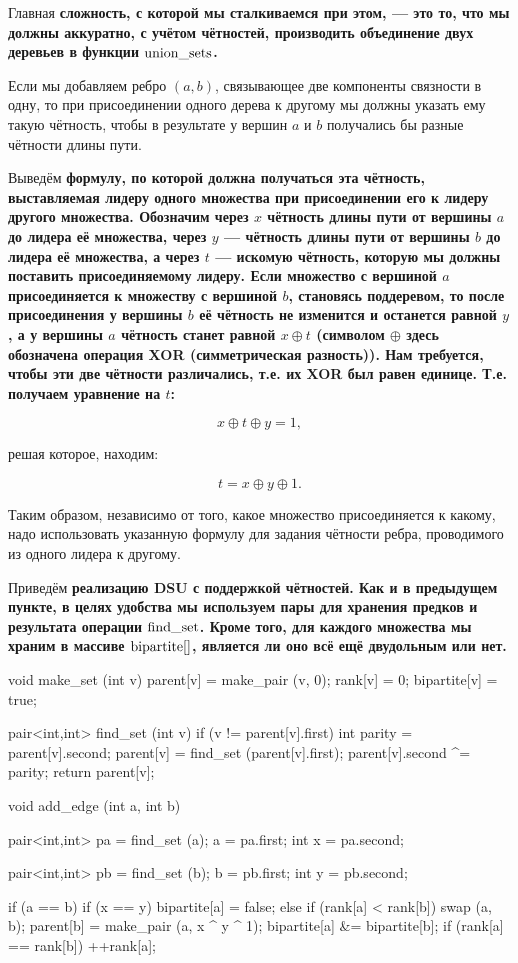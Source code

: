 Главная \bf{сложность}, с которой мы сталкиваемся при этом, --- это то, что мы должны аккуратно, с учётом чётностей, производить объединение двух деревьев в функции $\rm union\_sets$.

Если мы добавляем ребро $(a,b)$, связывающее две компоненты связности в одну, то при присоединении одного дерева к другому мы должны указать ему такую чётность, чтобы в результате у вершин $a$ и $b$ получались бы разные чётности длины пути.

Выведём \bf{формулу}, по которой должна получаться эта чётность, выставляемая лидеру одного множества при присоединении его к лидеру другого множества. Обозначим через $x$ чётность длины пути от вершины $a$ до лидера её множества, через $y$ --- чётность длины пути от вершины $b$ до лидера её множества, а через $t$ --- искомую чётность, которую мы должны поставить присоединяемому лидеру. Если множество с вершиной $a$ присоединяется к множеству с вершиной $b$, становясь поддеревом, то после присоединения у вершины $b$ её чётность не изменится и останется равной $y$, а у вершины $a$ чётность станет равной $x \oplus t$ (символом $\oplus$ здесь обозначена операция XOR (симметрическая разность)). Нам требуется, чтобы эти две чётности различались, т.е. их XOR был равен единице. Т.е. получаем уравнение на $t$:

$$ x \oplus t \oplus y = 1, $$

решая которое, находим:

$$ t = x \oplus y \oplus 1. $$

Таким образом, независимо от того, какое множество присоединяется к какому, надо использовать указанную формулу для задания чётности ребра, проводимого из одного лидера к другому.

Приведём \bf{реализацию} DSU с поддержкой чётностей. Как и в предыдущем пункте, в целях удобства мы используем пары для хранения предков и результата операции $\rm find\_set$. Кроме того, для каждого множества мы храним в массиве ${\rm bipartite}[]$, является ли оно всё ещё двудольным или нет.

\code
void make_set (int v) {
	parent[v] = make_pair (v, 0);
	rank[v] = 0;
	bipartite[v] = true;
}

pair<int,int> find_set (int v) {
	if (v != parent[v].first) {
		int parity = parent[v].second;
		parent[v] = find_set (parent[v].first);
		parent[v].second ^= parity;
	}
	return parent[v];
}

void add_edge (int a, int b) {
	pair<int,int> pa = find_set (a);
	a = pa.first;
	int x = pa.second;

	pair<int,int> pb = find_set (b);
	b = pb.first;
	int y = pb.second;

	if (a == b) {
		if (x == y)
			bipartite[a] = false;
	}
	else {
		if (rank[a] < rank[b])
			swap (a, b);
		parent[b] = make_pair (a, x ^ y ^ 1);
		bipartite[a] &= bipartite[b];
		if (rank[a] == rank[b])
			++rank[a];
	}
}

